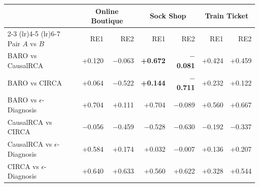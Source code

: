 \setlength{\tabcolsep}{5pt}
\begin{tabular}{@{}lrrrrrr@{}}
\toprule
 & \multicolumn{2}{c}{Online Boutique} & \multicolumn{2}{c}{Sock Shop} & \multicolumn{2}{c}{Train Ticket} \\
\cmidrule(lr){2-3} \cmidrule(lr){4-5} \cmidrule(lr){6-7}
Pair $A$ vs $B$ & RE1 & RE2 & RE1 & RE2 & RE1 & RE2 \\
\midrule
BARO vs CausalRCA & +0.120 & $-$0.063 & {\bfseries +0.672} & {\bfseries $-$0.081} & +0.424 & +0.459 \\
BARO vs CIRCA & +0.064 & $-$0.522 & {\bfseries +0.144} & {\bfseries $-$0.711} & +0.232 & +0.122 \\
BARO vs $\epsilon$-Diagnosis & +0.704 & +0.111 & +0.704 & $-$0.089 & +0.560 & +0.667 \\
CausalRCA vs CIRCA & $-$0.056 & $-$0.459 & $-$0.528 & $-$0.630 & $-$0.192 & $-$0.337 \\
CausalRCA vs $\epsilon$-Diagnosis & +0.584 & +0.174 & +0.032 & $-$0.007 & +0.136 & +0.207 \\
CIRCA vs $\epsilon$-Diagnosis & +0.640 & +0.633 & +0.560 & +0.622 & +0.328 & +0.544 \\
\bottomrule
\end{tabular}

